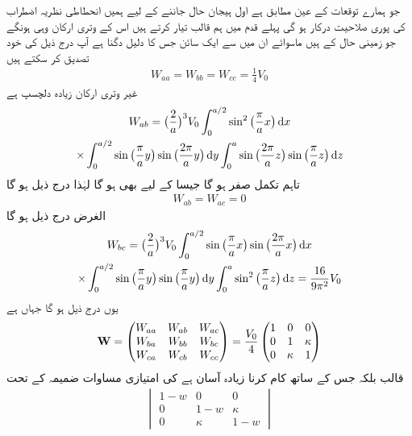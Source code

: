 جو ہمارے توقعات کے عین مطابق ہے اول ہیجان  حال جاننے کے لیے ہمیں انحطاطی نظریہ اضطراب کی  پوری صلاحیت درکار ہو گی پہلے قدم میں ہم قالب  تیار کرتے ہیں اس کے  وتری ارکان وہی ہونگے جو زمینی حال کے ہیں ماسوائے ان میں سے ایک سائن جس کا دلیل دگنا ہے آپ درج ذیل کی خود تصدیق کر سکتے  ہیں 
\begin{align*}
W_{aa} = W_{bb} = W_{cc} = \frac{1}{4} V_0
\end{align*}
غیر وتری ارکان زیادہ دلچسپ ہے 
\begin{multline*}
W_{ab} = \big ( \frac{2}{a} \big )^3 V_0 \int_0^{a/2} \sin^2 \big ( \frac{\pi}{a} x \big ) \dif x\\
\times \int_0^{a/2} \sin \big (\frac{\pi}{a} y \big ) \sin \big ( \frac{2 \pi}{a} y \big ) \dif y \int_0^a \sin \big ( \frac{2 \pi}{a} z \big ) \sin \big ( \frac{\pi}{a} z \big ) \dif z
\end{multline*}
تاہم  تکمل صفر ہو گا جیسا  کے لیے بھی ہو گا لہٰذا  درج ذیل ہو گا 
\begin{align*}
W_{ab} = W_{ac} = 0
\end{align*}
الغرض  درج ذیل ہو گا 
\begin{multline*}
W_{bc} = \big ( \frac{2}{a} \big )^3 V_0 \int_0^{a/2} \sin \big ( \frac{\pi}{a} x \big ) \sin \big (\frac{2 \pi}{a} x \big ) \dif x\\
\times \int_0^{a/2} \sin \big (\frac{\pi}{a} y \big ) \sin \big ( \frac{\pi}{a} y \big ) \dif y \int_0^a \sin^2 \big ( \frac{\pi}{a} z \big ) \dif z = \frac{16}{9 \pi^2} V_0
\end{multline*}
یوں درج ذیل ہو گا جہاں  ہے
\begin{align}
\bold{W} =
\begin{pmatrix}
W_{aa} & W_{ab} & W_{ac} \\
W_{ba} & W_{bb} & W_{bc} \\
W_{ca} & W_{cb} & W_{cc}
\end{pmatrix}=
 \frac{V_0}{4}
\begin{pmatrix}
1 & 0 & 0 \\
0 & 1 & \kappa \\
0 & \kappa & 1
\end{pmatrix}
\end{align}
قالب  بلکہ  جس کے ساتھ کام کرنا زیادہ آسان ہے کی امتیازی مساوات ضمیمہ  کے تحت
\begin{align*}
\begin{vmatrix}
1 - w & 0 & 0 \\
0 & 1 - w& \kappa \\
0 & \kappa & 1 - w
\end{vmatrix}
\end{align*}
